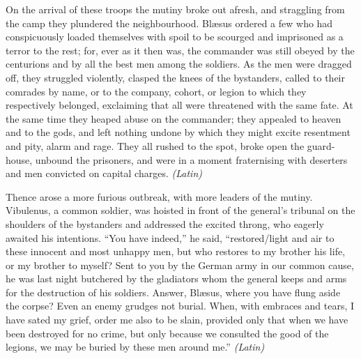 On the arrival of these troops the mutiny broke out afresh, and straggling from the camp they plundered the neighbourhood. Blæsus ordered a few who had conspicuously loaded themselves with spoil to be scourged and imprisoned as a terror to the rest; for, ever as it then was, the commander was still obeyed by the centurions and by all the best men among the soldiers. As the men were dragged off, they struggled violently, clasped the knees of the bystanders, called to their comrades by name, or to the company, cohort, or legion to which they respectively belonged, exclaiming that all were threatened with the same fate. At the same time they heaped abuse on the commander; they appealed to heaven and to the gods, and left nothing undone by which they might excite resentment and pity, alarm and rage. They all rushed to the spot, broke open the guard-house, unbound the prisoners, and were in a moment fraternising with deserters and men convicted on capital charges. \emph{(Latin)}


Thence arose a more furious outbreak, with more leaders of the mutiny. Vibulenus, a common soldier, was hoisted in front of the general's tribunal on the shoulders of the bystanders and addressed the excited throng, who eagerly awaited his intentions. ``You have indeed,'' he said, ``restored/light and air to these innocent and most unhappy men, but who restores to my brother his life, or my brother to myself? Sent to you by the German army in our common cause, he was last night butchered by the gladiators whom the general keeps and arms for the destruction of his soldiers. Answer, Blæsus, where you have flung aside the corpse? Even an enemy grudges not burial. When, with embraces and tears, I have sated my grief, order me also to be slain, provided only that when we have been destroyed for no crime, but only because we consulted the good of the legions, we may be buried by these men around me.'' \emph{(Latin)}


